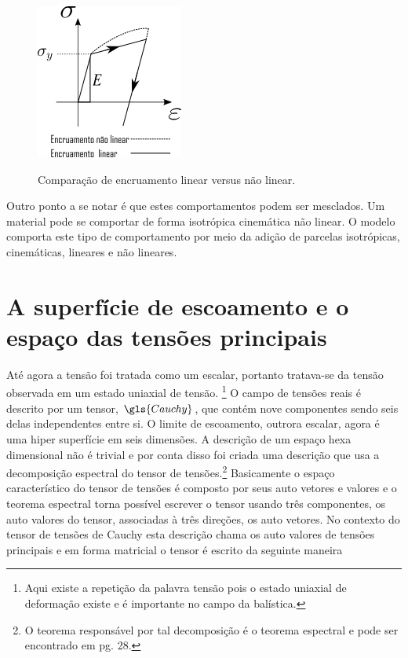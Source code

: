 \begin{figure}[H]
    \centering
    \caption{Comparação de encruamento linear versus não linear. } 
    \includegraphics[width=0.8\linewidth]{images/plasticidade_linnlin.png}
    \label{fig:plastlinvsnlin}
\end{figure}

Outro ponto a se notar é que estes comportamentos podem ser mesclados. Um material pode se comportar de forma isotrópica cinemática não linear. O modelo comporta este tipo de comportamento por meio da adição de parcelas isotrópicas, cinemáticas, lineares e não lineares. \\

\section{A superfície de escoamento e o espaço das tensões principais}

Até agora a tensão foi tratada como um escalar, portanto tratava-se da tensão observada em um estado uniaxial de tensão. \footnote{Aqui existe a repetição da palavra tensão pois o estado uniaxial de deformação existe e é importante no campo da balística.} O campo de tensões reais é descrito por um tensor, $ \gls{Cauchy} $, que contém nove componentes sendo seis delas independentes entre si. O limite de escoamento, outrora escalar, agora é uma hiper superfície em seis dimensões. A descrição de um espaço hexa dimensional não é trivial e por conta disso foi criada uma descrição que usa a decomposição espectral do tensor de tensões.\footnote{O teorema responsável por tal decomposição é o teorema 
espectral e pode ser encontrado em \cite{gurtin_fried_anand_2013} pg. 28. } Basicamente o espaço característico do tensor de tensões é composto por seus auto vetores e valores e o teorema espectral torna possível escrever o tensor usando três componentes, os auto valores do tensor, associadas à três direções, os auto vetores. No contexto do tensor de tensões de Cauchy esta descrição chama os auto valores de tensões principais e em forma matricial o tensor é escrito da seguinte maneira

